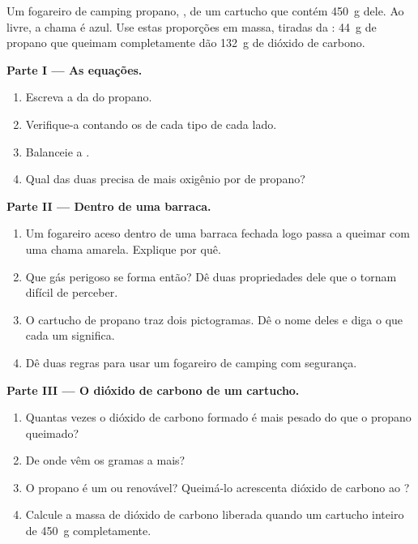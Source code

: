 \begin{problem}
\label{pb:g8:combustion-and-fuels:1}
Um fogareiro de camping  propano, , de um cartucho que
contém \qty{450}{g} dele. Ao  livre, a chama é azul. Use estas
proporções em massa, tiradas da : \qty{44}{g} de
propano que queimam completamente dão \qty{132}{g} de dióxido de
carbono.

\medskip
\noindent\textbf{Parte I --- As equações.}
\begin{enumerate}
  \item Escreva a  da  do propano.
  \item Verifique-a contando os  de cada tipo de cada lado.
  \item Balanceie a 
        . %
  \item Qual das duas precisa de mais oxigênio por  de propano?
\end{enumerate}

\medskip
\noindent\textbf{Parte II --- Dentro de uma barraca.}
\begin{enumerate}[resume]
  \item Um fogareiro aceso dentro de uma barraca fechada logo passa a
        queimar com uma chama amarela. Explique por quê.
  \item Que gás perigoso se forma então? Dê duas propriedades dele que o
        tornam difícil de perceber.
  \item O cartucho de propano traz dois pictogramas. Dê o nome deles e
        diga o que cada um significa.
  \item Dê duas regras para usar um fogareiro de camping com segurança.
\end{enumerate}

\medskip
\noindent\textbf{Parte III --- O dióxido de carbono de um cartucho.}
\begin{enumerate}[resume]
  \item Quantas vezes o dióxido de carbono formado é mais pesado do que o
        propano queimado?
  \item De onde vêm os gramas a mais?
  \item O propano é um  ou renovável? Queimá-lo
        acrescenta dióxido de carbono ao ?
  \item Calcule a massa de dióxido de carbono liberada quando um cartucho
        inteiro de \qty{450}{g}  completamente.
\end{enumerate}
\end{problem}
